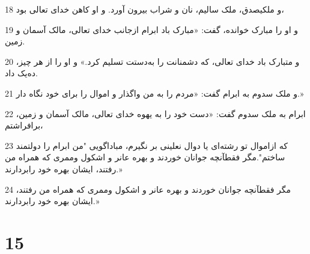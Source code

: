 \par 18 و ملکیصدق، ملک سالیم، نان و شراب بیرون آورد. و او کاهن خدای تعالی بود،
\par 19 و او را مبارک خوانده، گفت: «مبارک باد ابرام ازجانب خدای تعالی، مالک آسمان و زمین.
\par 20 و متبارک باد خدای تعالی، که دشمنانت را به‌دستت تسلیم کرد.» و او را از هر چیز، ده‌یک داد.
\par 21 و ملک سدوم به ابرام گفت: «مردم را به من واگذار و اموال را برای خود نگاه دار.»
\par 22 ابرام به ملک سدوم گفت: «دست خود را به یهوه خدای تعالی، مالک آسمان و زمین، برافراشتم،
\par 23 که ازاموال تو رشته‌ای یا دوال نعلینی بر نگیرم، مباداگویی "من ابرام را دولتمند ساختم".مگر فقطآنچه جوانان خوردند و بهره عانر و اشکول وممری که همراه من رفتند، ایشان بهره خود رابردارند.»
\par 24 مگر فقطآنچه جوانان خوردند و بهره عانر و اشکول وممری که همراه من رفتند، ایشان بهره خود رابردارند.»
 
\chapter{15}

